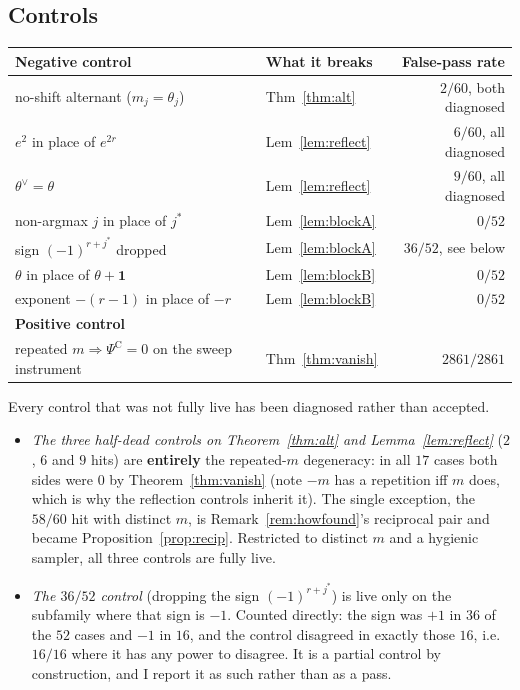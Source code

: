 \documentclass[11pt]{article}
\theoremstyle{definition}
\newcommand{\PsiC}{\Psi^{\mathrm{C}}}
\newcommand{\bone}{\mathbf{1}}
\begin{document}
\subsection{Controls}

\begin{center}
\begin{tabular}{llr}
\hline
\textbf{Negative control} & \textbf{What it breaks} & \textbf{False-pass rate}\\
\hline
no-shift alternant ($m_j=\theta_j$) & Thm~\ref{thm:alt} & $2/60$, both diagnosed\\
$e^{2}$ in place of $e^{2r}$ & Lem~\ref{lem:reflect} & $6/60$, all diagnosed\\
$\theta^\vee=\theta$ & Lem~\ref{lem:reflect} & $9/60$, all diagnosed\\
non-argmax $j$ in place of $j^\ast$ & Lem~\ref{lem:blockA} & $0/52$\\
sign $(-1)^{r+j^\ast}$ dropped & Lem~\ref{lem:blockA} & $36/52$, see below\\
$\theta$ in place of $\theta+\bone$ & Lem~\ref{lem:blockB} & $0/52$\\
exponent $-(r{-}1)$ in place of $-r$ & Lem~\ref{lem:blockB} & $0/52$\\
\hline
\textbf{Positive control} & & \\
repeated $m\Rightarrow\PsiC=0$ on the sweep instrument & Thm~\ref{thm:vanish} & $2861/2861$\\
\hline
\end{tabular}
\end{center}

Every control that was not fully live has been diagnosed rather than accepted.

\begin{itemize}
\item \emph{The three half-dead controls on Theorem~\ref{thm:alt} and
  Lemma~\ref{lem:reflect}} ($2$, $6$ and $9$ hits) are \textbf{entirely} the repeated-$m$
  degeneracy: in all $17$ cases both sides were $0$ by Theorem~\ref{thm:vanish} (note
  $-m$ has a repetition iff $m$ does, which is why the reflection controls inherit it).
  The single exception, the $58/60$ hit with distinct $m$, is
  Remark~\ref{rem:howfound}'s reciprocal pair and became Proposition~\ref{prop:recip}.
  Restricted to distinct $m$ and a hygienic sampler, all three controls are fully live.
\item \emph{The $36/52$ control} (dropping the sign $(-1)^{r+j^\ast}$) is live only on the
  subfamily where that sign is $-1$. Counted directly: the sign was $+1$ in $36$ of the
  $52$ cases and $-1$ in $16$, and the control disagreed in exactly those $16$, i.e.\
  $16/16$ where it has any power to disagree. It is a partial control by construction, and
  I report it as such rather than as a pass.
\end{itemize}
\end{document}
